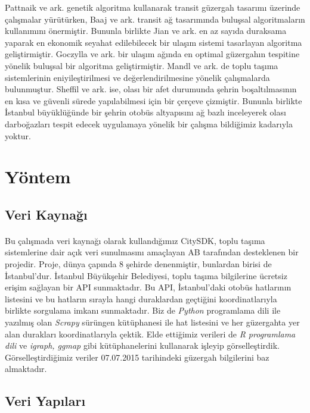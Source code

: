 \documentclass[10pt,a4paper,twocolumn]{article}
\begin{document}
Pattnaik ve ark. genetik algoritma kullanarak transit güzergah tasarımı üzerinde çalışmalar \cite{pattnaik1998urban} yürütürken, Baaj ve ark. transit ağ tasarımında buluşsal algoritmaların kullanımını \cite{baaj1995hybrid} önermiştir. Bununla birlikte Jian ve ark. en az sayıda duraksama yaparak en ekonomik seyahat edilebilecek bir ulaşım sistemi tasarlayan algoritma \cite{jian2005public} geliştirmiştir. Goczylla ve ark. bir ulaşım ağında en optimal güzergahın tespitine yönelik buluşsal bir algoritma \cite{goczylla1995optimal} geliştirmiştir.  Mandl ve ark. de toplu taşıma sistemlerinin eniyileştirilmesi ve değerlendirilmesine yönelik çalışmalarda \cite{mandl1980evaluation} bulunmuştur. Sheffil ve ark. ise, olası bir afet durumunda şehrin boşaltılmasının en kısa ve güvenli sürede yapılabilmesi için bir çerçeve \cite{sheffi1982transportation} çizmiştir. Bununla birlikte İstanbul büyüklüğünde bir şehrin otobüs altyapısını ağ bazlı inceleyerek olası darboğazları tespit edecek uygulamaya yönelik bir çalışma bildiğimiz kadarıyla yoktur.

\section{Yöntem}
\subsection{Veri Kaynağı}
\paragraph{} Bu çalışmada veri kaynağı olarak kullandığımız CitySDK, toplu taşıma sistemlerine dair açık veri sunulmasını amaçlayan AB tarafından desteklenen bir projedir. Proje, dünya çapında 8 şehirde denenmiştir, bunlardan birisi de İstanbul'dur. İstanbul Büyükşehir Belediyesi, toplu taşıma bilgilerine ücretsiz erişim sağlayan bir API sunmaktadır. Bu API, İstanbul'daki otobüs hatlarının listesini ve bu hatların sırayla hangi duraklardan geçtiğini koordinatlarıyla birlikte sorgulama imkanı sunmaktadır. Biz de \textit{Python} programlama dili ile yazılmış olan \textit{Scrapy} sürüngen kütüphanesi ile hat listesini ve her güzergahta yer alan durakları koordinatlarıyla çektik. Elde ettiğimiz verileri de \textit{R programlama dili} ve \textit{igraph, ggmap} gibi kütüphanelerini kullanarak işleyip görselleştirdik. Görselleştirdiğimiz veriler 07.07.2015 tarihindeki güzergah bilgilerini baz almaktadır.

\subsection{Veri Yapıları}
\end{document}
